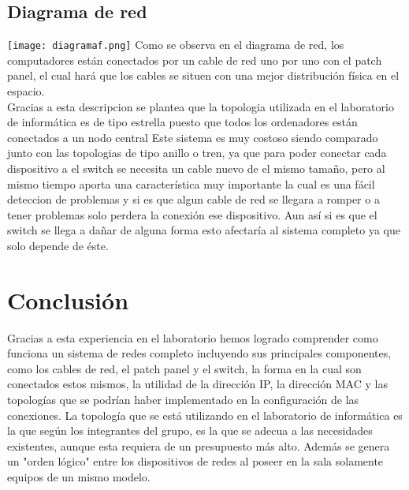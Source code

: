 \documentclass{udpreport}
\begin{document}
	\section{Diagrama de red}
		\texttt{[image: diagramaf.png]}
		Como se observa en el diagrama de red, los computadores están conectados por un cable de red uno por uno 
		con el patch panel, el cual hará que los cables se situen con una mejor distribución física 
		en el espacio.\\
		Gracias a esta descripcion se plantea que la topologia utilizada en el laboratorio de informática es de tipo estrella 
		puesto que todos los ordenadores están conectados a un nodo central Este sistema es muy costoso siendo comparado junto
		con las topologias de tipo anillo o tren, ya que para poder conectar cada dispositivo a el switch se necesita un cable
		nuevo de el mismo tamaño, pero al mismo tiempo aporta una característica muy importante la cual es una fácil deteccion
		de problemas y si es que algun cable de red se llegara a romper o a tener problemas solo perdera la conexión ese 
		dispositivo. Aun así si es que el switch se llega a dañar de alguna forma esto afectaría al sistema completo ya que 
		solo depende de éste.
\chapter{Conclusión}
                Gracias a esta experiencia en el laboratorio hemos logrado comprender como funciona un sistema de redes completo 
                incluyendo sus principales componentes, como los cables de red, el patch panel y el switch, la forma en la cual son 
                conectados estos mismos, la utilidad de la dirección IP, la dirección MAC y las topologías que se podrían haber 
                implementado en la configuración de las conexiones. La topología que se está utilizando en el laboratorio de 
                informática es la que según los integrantes del grupo, es la que se adecua a las necesidades existentes, aunque esta 
                requiera de un presupuesto más alto. Además se genera un "orden lógico" entre los dispositivos de redes al poseer en 
                la sala solamente equipos de un mismo modelo.
\end{document}
